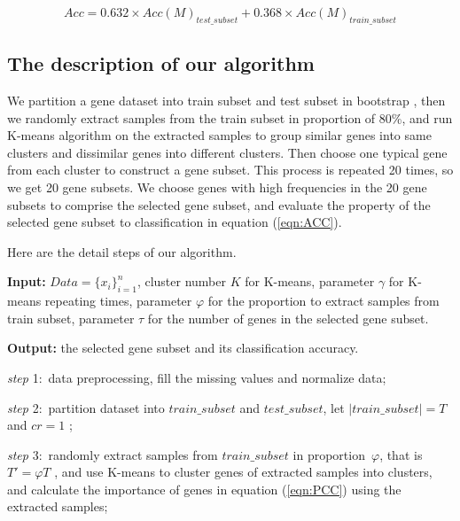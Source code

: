 \documentclass[runningheads,a4paper]{llncs}
\begin{document}
\begin{equation}\label{eqn:ACC}
Acc = 0.632\times{Acc(M)_{test\_subset}} + 0.368\times{Acc(M)_{train\_subset}}
\end{equation}

%


\subsection{The description of our algorithm}

We partition a gene dataset into train subset and test subset in bootstrap \cite{han2006data}, then we randomly extract samples from the train subset in proportion of 80\%, and run K-means algorithm on the extracted samples to group similar genes into same clusters and dissimilar genes into different clusters. Then choose one typical gene from each cluster to construct a gene subset. This process is repeated 20 times, so we get 20 gene subsets. We choose genes with high frequencies in the 20 gene subsets to comprise the selected gene subset, and evaluate the property of the selected gene subset to classification in equation (\ref{eqn:ACC}).



Here are the detail steps of our algorithm.


\textbf{Input:} $Data = \{ x_i \}_{i=1}^n$, cluster number $K$ for K-means, parameter $\gamma$ for K-means repeating times, parameter $\varphi$  for the proportion to extract samples from train subset, parameter $\tau$ for the number of genes  in the selected gene subset.

\textbf{Output:} the selected gene subset and its classification accuracy.
 
\emph {step} 1:~data preprocessing, fill the missing values and normalize data;

\emph{step} 2:~partition dataset into $train\_subset$ and $test\_subset$, let $|train\_subset| = T$  and $cr = 1$ ;
 
\emph{step} 3:~randomly extract samples from $train\_subset$ in proportion~$\varphi$, that is $T'= \varphi T$ , and use K-means to cluster genes of extracted samples into clusters, and calculate the importance of genes in equation (\ref{eqn:PCC}) using the extracted samples; 
 
\end{document}
